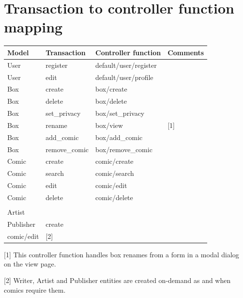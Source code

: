 \documentclass[fontsize=12pt,a4paper]{scrreprt}
\begin{document}
\section{Transaction to controller function mapping}

\begin{tabularx}{\linewidth}{lllX}\toprule
\textbf{Model} & \textbf{Transaction} & \textbf{Controller function} & \textbf{Comments} \\ \hline

User & register & default/user/register &  \\
User & edit & default/user/profile &  \\ \hline

Box & create & box/create &  \\
Box & delete & box/delete &  \\
Box & set\_privacy & box/set\_privacy &  \\
Box & rename & box/view & \textsf{[1]} \\
Box & add\_comic & box/add\_comic &  \\
Box & remove\_comic & box/remove\_comic &  \\ \hline

Comic & create & comic/create &  \\
Comic & search & comic/search &  \\
Comic & edit & comic/edit &  \\
Comic & delete & comic/delete &  \\ \hline

\begin{tabular}[c]{@{}l@{}}Writer\\ Artist\\ Publisher\end{tabular} & create & \begin{tabular}[c]{@{}l@{}}comic/create\\ comic/edit\end{tabular} & \textsf{[2]} \\

\bottomrule
\end{tabularx}

{
  \setlength{\parindent}{0pt}
  \setlength{\parskip}{0.4em}

  \textsf{[1]} This controller function handles box renames from a form in a modal dialog on the \textsf{view} page.

  \textsf{[2]} \textsf{Writer}, \textsf{Artist} and \textsf{Publisher} entities are created on-demand as and when comics require them.
}
\end{document}
